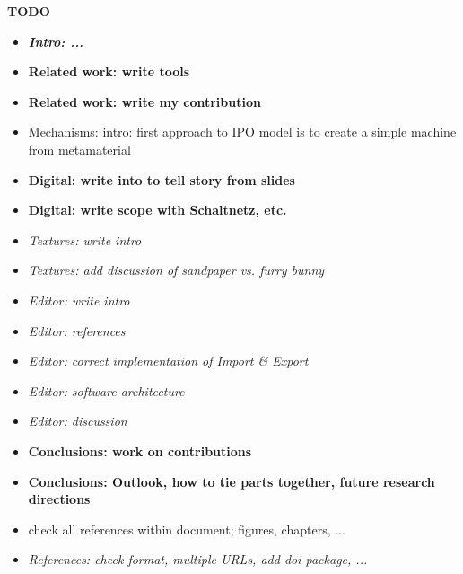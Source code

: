 
{\large \textbf{TODO}}

\newcommand{\done}[1]{\textit{\textcolor{doneGray}{#1}}}

\begin{itemize}
    \item \done{\textbf{Intro: ...}}

    \item \textbf{Related work: write tools}
    \item \textbf{Related work: write my contribution}

    \item Mechanisms: intro: first approach to IPO model is to create a simple machine from metamaterial

    \item \textbf{Digital: write into to tell story from slides}
    \item \textbf{Digital: write scope with Schaltnetz, etc.}

    \item \done{Textures: write intro}
    \item \done{Textures: add discussion of sandpaper vs. furry bunny}

    \item \done{Editor: write intro}
    \item \done{Editor: references}
    \item \done{Editor: correct implementation of Import \& Export}
    \item \done{Editor: software architecture}
    \item \done{Editor: discussion}

    \item \textbf{Conclusions: work on contributions}
    \item \textbf{Conclusions: Outlook, how to tie parts together, future research directions}

    \item check all references within document; figures, chapters, ...
    \item \done{References: check format, multiple URLs, add doi package, ...}
\end{itemize}